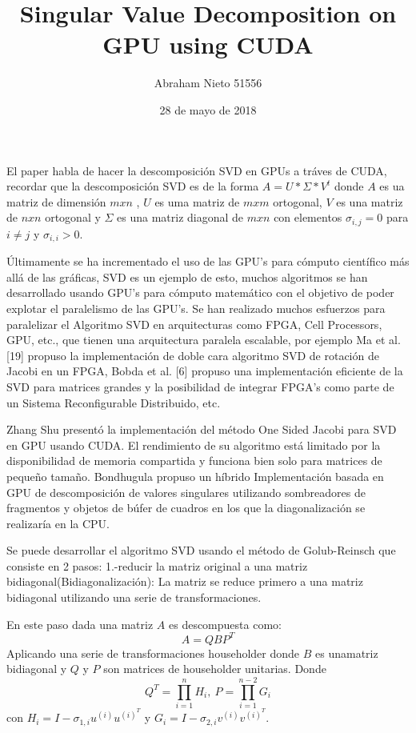 \documentclass[]{article}
\title{Singular Value Decomposition on GPU using CUDA}
\author{Abraham Nieto 51556}
\date{28 de mayo de 2018}
\begin{document}
\maketitle

El paper habla de hacer la descomposición SVD en GPUs a tráves de CUDA,
recordar que la descomposición SVD es de la forma \(A=U*\Sigma*V^t\)
donde \(A\) es ua matriz de dimensión \(mxn\) , \(U\) es uma matriz de
\(mxm\) ortogonal, \(V\) es una matriz de \(nxn\) ortogonal y \(\Sigma\)
es una matriz diagonal de \(mxn\) con elementos \(\sigma_{i,j}=0\) para
\(i \neq j\) y \(\sigma_{i,i}>0\).

Últimamente se ha incrementado el uso de las GPU's para cómputo
científico más allá de las gráficas, SVD es un ejemplo de esto, muchos
algoritmos se han desarrollado usando GPU's para cómputo matemático con
el objetivo de poder explotar el paralelismo de las GPU's. Se han
realizado muchos esfuerzos para paralelizar el Algoritmo SVD en
arquitecturas como FPGA, Cell Processors, GPU, etc., que tienen una
arquitectura paralela escalable, por ejemplo Ma et al. {[}19{]} propuso
la implementación de doble cara algoritmo SVD de rotación de Jacobi en
un FPGA, Bobda et al. {[}6{]} propuso una implementación eficiente de la
SVD para matrices grandes y la posibilidad de integrar FPGA's como parte
de un Sistema Reconfigurable Distribuido, etc.

Zhang Shu presentó la implementación del método One Sided Jacobi para
SVD en GPU usando CUDA. El rendimiento de su algoritmo está limitado por
la disponibilidad de memoria compartida y funciona bien solo para
matrices de pequeño tamaño. Bondhugula propuso un híbrido Implementación
basada en GPU de descomposición de valores singulares utilizando
sombreadores de fragmentos y objetos de búfer de cuadros en los que la
diagonalización se realizaría en la CPU.

Se puede desarrollar el algoritmo SVD usando el método de Golub-Reinsch
que consiste en 2 pasos: 1.-reducir la matriz original a una matriz
bidiagonal(Bidiagonalización): La matriz se reduce primero a una matriz
bidiagonal utilizando una serie de transformaciones.

En este paso dada una matriz \(A\) es descompuesta como: \[
A=QBP^T
\] Aplicando una serie de transformaciones householder donde \(B\) es
unamatriz bidiagonal y \(Q\) y \(P\) son matrices de householder
unitarias. Donde \[
Q^T=\prod_{i=1}^{n} H_{i},\ P=\prod_{i=1}^{n-2} G_{i}
\] con \(H_{i}=I-\sigma_{1,i}u^(i)u^(i)^T\) y
\(G_{i}=I-\sigma_{2,i}v^(i)v^(i)^T\).
\end{document}
